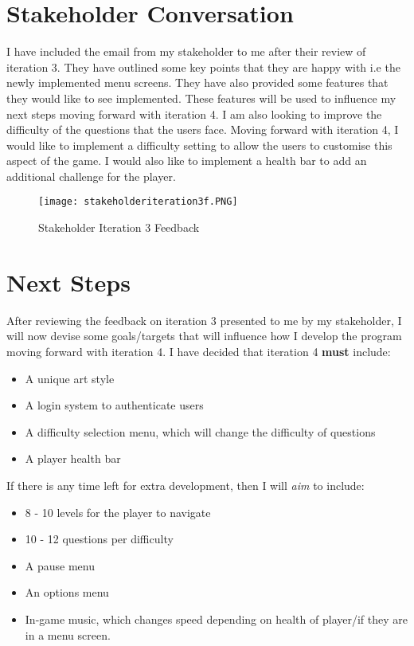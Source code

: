 \documentclass[12pt]{report}
\begin{document}
\pagebreak

\section{Stakeholder Conversation}
I have included the email from my stakeholder to me after their review of iteration 3. They have outlined some key points that they are happy with i.e the newly implemented menu screens. They have also provided some features that they would like to see implemented. These features will be used to influence my next steps moving forward with iteration 4. I am also looking to improve the difficulty of the questions that the users face. Moving forward with iteration 4, I would like to implement a difficulty setting to allow the users to customise this aspect of the game. I would also like to implement a health bar to add an additional challenge for the player. 


\begin{figure}[H]
    \centering
    \texttt{[image: stakeholderiteration3f.PNG]}
    \caption{Stakeholder Iteration 3 Feedback}
\end{figure}

\section{Next Steps}
After reviewing the feedback on iteration 3 presented to me by my stakeholder, I will now devise some goals/targets that will influence how I develop the program moving forward with iteration 4. 
\newline
\newline
I have decided that iteration 4 \textbf{must} include: 
\begin{itemize}
    \item A unique art style
    \item A login system to authenticate users
    \item A difficulty selection menu, which will change the difficulty of questions
    \item A player health bar
\end{itemize}
If there is any time left for extra development, then I will \textit{aim} to include:
\begin{itemize}
    \item 8 - 10 levels for the player to navigate
    \item 10 - 12 questions per difficulty
    \item A pause menu
    \item An options menu
    \item In-game music, which changes speed depending on health of player/if they are in a menu screen.
\end{itemize}
\end{document}
